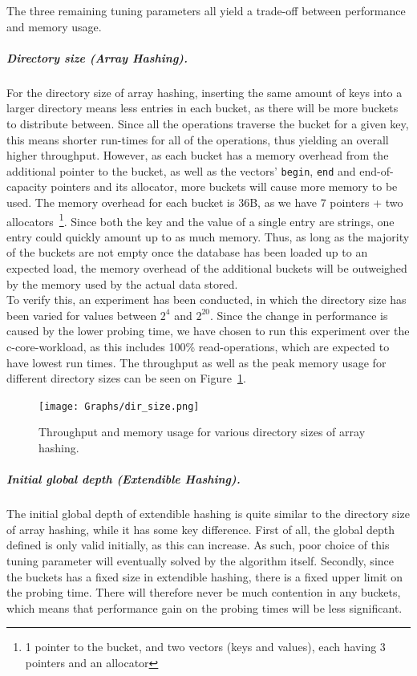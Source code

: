 \documentclass[11pt]{article} %
\begin{document}
The three remaining tuning parameters all yield a trade-off between performance and memory usage. 
\subparagraph{Directory size (Array Hashing).} For the directory size of array hashing, inserting the same amount of keys into a larger directory means less entries in each bucket, as there will be more buckets to distribute between. Since all the operations traverse the bucket for a given key, this means shorter run-times for all of the operations, thus yielding an overall higher throughput. However, as each bucket has a memory overhead from the additional pointer to the bucket, as well as the vectors' \verb|begin|, \verb|end| and end-of-capacity pointers and its allocator, more buckets will cause more memory to be used. The memory overhead for each bucket is 36B, as we have 7 pointers + two allocators~\footnote{1 pointer to the bucket, and two vectors (keys and values), each having 3 pointers and an allocator}. Since both the key and the value of a single entry are strings, one entry could quickly amount up to as much memory. Thus, as long as the majority of the buckets are not empty once the database has been loaded up to an expected load, the memory overhead of the additional buckets will be outweighed by the memory used by the actual data stored.\\

To verify this, an experiment has been conducted, in which the directory size has been varied for values between $2^4$ and $2^{20}$. Since the change in performance is caused by the lower probing time, we have chosen to run this experiment over the c-core-workload, as this includes 100\% read-operations, which are expected to have lowest run times. The throughput as well as the peak memory usage for different directory sizes can be seen on Figure~\ref{fig:dir_size}.

\begin{figure}[H]
  \centering
  \texttt{[image: Graphs/dir\_size.png]}\\
  \caption{Throughput and memory usage for various directory sizes of array hashing.}\label{fig:dir_size}
\end{figure}

\subparagraph{Initial global depth (Extendible Hashing).} The initial global depth of extendible hashing is quite similar to the directory size of array hashing, while it has some key difference. First of all, the global depth defined is only valid initially, as this can increase. As such, poor choice of this tuning parameter will eventually solved by the algorithm itself. Secondly, since the buckets has a fixed size in extendible hashing, there is a fixed upper limit on the probing time. There will therefore never be much contention in any buckets, which means that performance gain on the probing times will be less significant.\\
\end{document}
